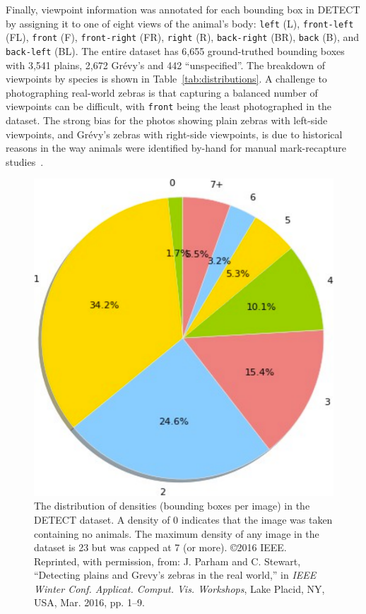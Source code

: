 Finally, viewpoint information was annotated for each bounding box in DETECT by assigning it to one of eight views of the animal's body: \texttt{left} (L), \texttt{front-left} (FL), \texttt{front} (F), \texttt{front-right} (FR), \texttt{right} (R), \texttt{back-right} (BR), \texttt{back} (B), and \texttt{back-left} (BL).  The entire dataset has 6,655 ground-truthed bounding boxes with 3,541 plains, 2,672 Gr\'evy's and 442 ``unspecified''.  The breakdown of viewpoints by species is shown in Table~\ref{tab:distributions}.  A challenge to photographing real-world zebras is that capturing a balanced number of viewpoints can be difficult, with \texttt{front} being the least photographed in the dataset.  The strong bias for the photos showing plain zebras with left-side viewpoints, and Gr\'evy's zebras with right-side viewpoints, is due to historical reasons in the way animals were identified by-hand for manual mark-recapture studies~\cite{parham_photographic_2015, macedo_ecology_2010}.

\begin{figure}[!t]
    \begin{center}
        \includegraphics[width=0.5\linewidth]{resources/densities.pdf}
    \end{center}
    \caption{The distribution of densities (bounding boxes per image) in the DETECT dataset.  A density of 0 indicates that the image was taken containing no animals.  The maximum density of any image in the dataset is 23 but was capped at 7 (or more).  \copyright 2016 IEEE. Reprinted, with permission, from: J. Parham and C. Stewart, ``Detecting plains and Grevy’s zebras in the real world,'' in \textit{IEEE Winter Conf. Applicat. Comput. Vis. Workshops}, Lake Placid, NY, USA, Mar. 2016, pp. 1–9.}
    \label{fig:densities}
\end{figure}

